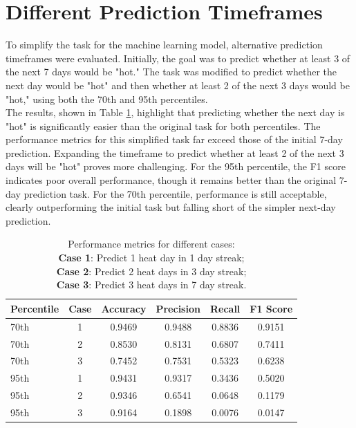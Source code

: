 \documentclass[conference,9pt]{IEEEtran}
\begin{document}
\section{Different Prediction Timeframes}
To simplify the task for the machine learning model, alternative prediction timeframes were evaluated. Initially, the goal was to predict whether at least 3 of the next 7 days would be "hot." The task was modified to predict whether the next day would be "hot" and then whether at least 2 of the next 3 days would be "hot," using both the 70th and 95th percentiles. \\
The results, shown in Table \ref{tab:timeframe}, highlight that predicting whether the next day is "hot" is significantly easier than the original task for both percentiles. The performance metrics for this simplified task far exceed those of the initial 7-day prediction. Expanding the timeframe to predict whether at least 2 of the next 3 days will be "hot" proves more challenging. For the 95th percentile, the F1 score indicates poor overall performance, though it remains better than the original 7-day prediction task. For the 70th percentile, performance is still acceptable, clearly outperforming the initial task but falling short of the simpler next-day prediction.
\begin{table}[!t]
    \centering
    \caption{Performance metrics for different cases:\\
    \textbf{Case 1}: Predict 1 heat day in 1 day streak;\\
    \textbf{Case 2}: Predict 2 heat days in 3 day streak;\\
    \textbf{Case 3}: Predict 3 heat days in 7 day streak.}
    \label{tab:timeframe}
    \begin{tabular}{lccccc}
        \toprule
        \textbf{Percentile} & \textbf{Case} & \textbf{Accuracy} & \textbf{Precision} & \textbf{Recall} & \textbf{F1 Score} \\
        \midrule
        70th & 1 & 0.9469 & 0.9488 & 0.8836 & 0.9151 \\
        70th & 2 & 0.8530 & 0.8131 & 0.6807 & 0.7411 \\
        70th & 3 & 0.7452 & 0.7531 & 0.5323 & 0.6238 \\
        95th & 1 & 0.9431 & 0.9317 & 0.3436 & 0.5020 \\
        95th & 2 & 0.9346 & 0.6541 & 0.0648 & 0.1179 \\
        95th & 3 & 0.9164 & 0.1898 & 0.0076 & 0.0147 \\
        \bottomrule
    \end{tabular}
\end{table}
\end{document}
